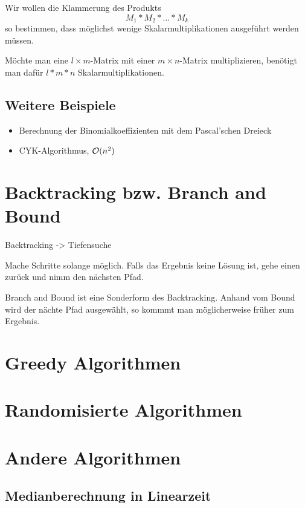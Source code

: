 Wir wollen die Klammerung des Produkts
\begin{equation*}
	M_1*M_2*\ldots*M_k
\end{equation*}
so bestimmen, dass möglichst wenige Skalarmultiplikationen ausgeführt werden müssen.

Möchte man eine $l\times m$-Matrix mit einer $m\times n$-Matrix multiplizieren, benötigt man dafür $l*m*n$ Skalarmultiplikationen.



\subsection{Weitere Beispiele}
\begin{itemize}
	\item Berechnung der Binomialkoeffizienten mit dem Pascal'schen Dreieck
	\item CYK-Algorithmus, $\mathcal O(n^2)$
\end{itemize}

\section{Backtracking bzw. Branch and Bound}
Backtracking -> Tiefensuche

Mache Schritte solange möglich. Falls das Ergebnis keine Lösung ist, gehe einen zurück und nimm den nächsten Pfad.


Branch and Bound ist eine Sonderform des Backtracking. Anhand vom Bound wird der nächte Pfad ausgewählt, so kommmt man möglicherweise früher zum Ergebnis.

\section{Greedy Algorithmen}
\section{Randomisierte Algorithmen}






\section{Andere Algorithmen}



\subsection{Medianberechnung in Linearzeit}






